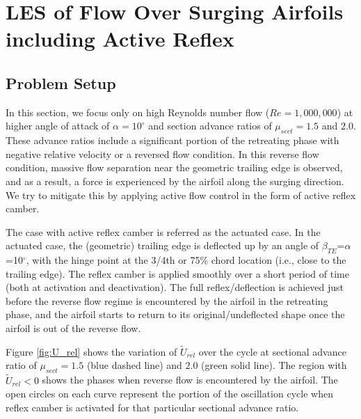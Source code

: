 \chapter{LES of Flow Over Surging Airfoils including Active Reflex}

\section{Problem Setup}

In this section, we focus only on high Reynolds number flow ($Re=1,000,000$) at higher angle of attack of $\alpha=10^\circ$ and section advance ratios of $\mu_{sect}= 1.5$ and $2.0$. 
These advance ratios include a significant portion of the retreating phase with negative relative velocity or a reversed flow condition. 
In this reverse flow condition, massive flow separation near the geometric trailing edge is observed, and as a result, a force is experienced by the airfoil along the surging direction. 
We try to mitigate this by applying active flow control in the form of active reflex camber. 

The case with active reflex camber is referred as the actuated case.
In the actuated case, the (geometric) trailing edge is deflected up by an angle of $\beta_{TE}$=$\alpha$=10$^\circ$, with the hinge point at the 3/4th or 75\% chord location (i.e., close to the trailing edge).
The reflex camber is applied smoothly over a short period of time (both at activation and deactivation).
The full reflex/deflection is achieved just before the reverse flow regime is encountered by the airfoil in the retreating phase, and the airfoil starts to return to its original/undeflected shape once the airfoil is out of the reverse flow.

Figure \ref{fig:U_rel} shows the variation of $\tilde{U}_{rel}$ over the cycle at sectional advance ratio of $\mu_{sect}=1.5$ (blue dashed line) and $2.0$ (green solid line).
The region with $\tilde{U}_{rel}<0$ shows the phases when reverse flow is encountered by the airfoil.
The open circles on each curve represent the portion of the oscillation cycle when reflex camber is activated for that particular sectional advance ratio.


